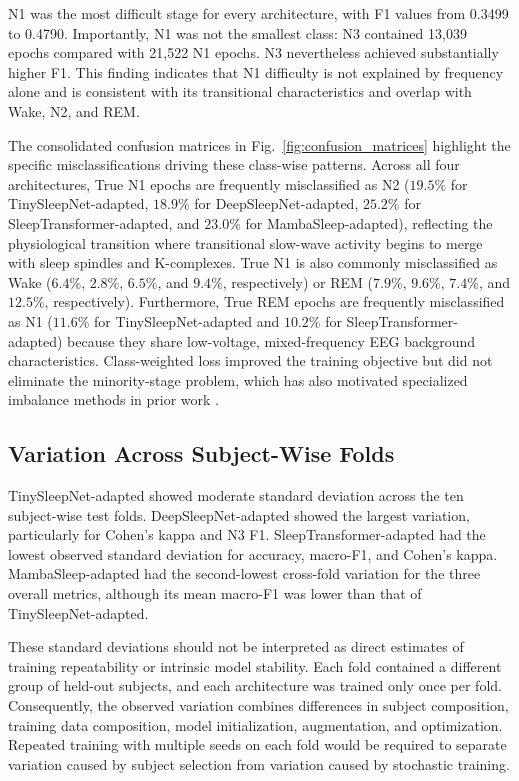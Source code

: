 \documentclass[conference]{IEEEtran}
\begin{document}
N1 was the most difficult stage for every architecture, with F1 values from 0.3499 to 0.4790. Importantly, N1 was not the smallest class: N3 contained 13,039 epochs compared with 21,522 N1 epochs. N3 nevertheless achieved substantially higher F1. This finding indicates that N1 difficulty is not explained by frequency alone and is consistent with its transitional characteristics and overlap with Wake, N2, and REM.

The consolidated confusion matrices in Fig.~\ref{fig:confusion_matrices} highlight the specific misclassifications driving these class-wise patterns. Across all four architectures, True N1 epochs are frequently misclassified as N2 ($19.5\%$ for TinySleepNet-adapted, $18.9\%$ for DeepSleepNet-adapted, $25.2\%$ for SleepTransformer-adapted, and $23.0\%$ for MambaSleep-adapted), reflecting the physiological transition where transitional slow-wave activity begins to merge with sleep spindles and K-complexes. True N1 is also commonly misclassified as Wake ($6.4\%$, $2.8\%$, $6.5\%$, and $9.4\%$, respectively) or REM ($7.9\%$, $9.6\%$, $7.4\%$, and $12.5\%$, respectively). Furthermore, True REM epochs are frequently misclassified as N1 ($11.6\%$ for TinySleepNet-adapted and $10.2\%$ for SleepTransformer-adapted) because they share low-voltage, mixed-frequency EEG background characteristics. Class-weighted loss improved the training objective but did not eliminate the minority-stage problem, which has also motivated specialized imbalance methods in prior work \cite{zhou2022imbalance}.

\subsection{Variation Across Subject-Wise Folds}

TinySleepNet-adapted showed moderate standard deviation across the ten subject-wise test folds. DeepSleepNet-adapted showed the largest variation, particularly for Cohen's kappa and N3 F1. SleepTransformer-adapted had the lowest observed standard deviation for accuracy, macro-F1, and Cohen's kappa. MambaSleep-adapted had the second-lowest cross-fold variation for the three overall metrics, although its mean macro-F1 was lower than that of TinySleepNet-adapted.

These standard deviations should not be interpreted as direct estimates of training repeatability or intrinsic model stability. Each fold contained a different group of held-out subjects, and each architecture was trained only once per fold. Consequently, the observed variation combines differences in subject composition, training data composition, model initialization, augmentation, and optimization. Repeated training with multiple seeds on each fold would be required to separate variation caused by subject selection from variation caused by stochastic training.
\end{document}
